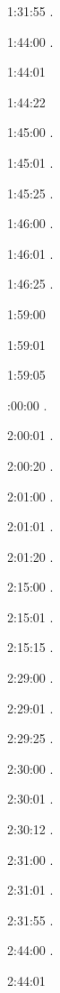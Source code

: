 \documentclass[italian]{article}
\begin{document}
1:31:55   .

1:44:00   .

1:44:01   

1:44:22   

1:45:00   .

1:45:01   .

1:45:25   .

1:46:00   .

1:46:01   .

1:46:25   .

1:59:00   

1:59:01   

1:59:05   

:00:00  .

2:00:01   . 

2:00:20  .

2:01:00   . 

2:01:01  .

2:01:20   . 

2:15:00   . 

2:15:01   . 

2:15:15   . 

2:29:00   . 

2:29:01   . 

2:29:25   . 

2:30:00   .

2:30:01   .

2:30:12   .

2:31:00   .

2:31:01   .

2:31:55   .

2:44:00   .

2:44:01   
\end{document}
